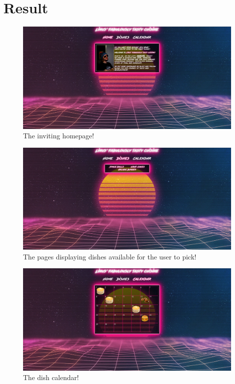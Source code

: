 \documentclass[a4paper]{scrartcl}
\begin{document}
\section{Result}
\begin{figure}[H]
  \begin{center}
    \includegraphics[scale=0.3]{Scr2.jpg}
    \caption{The inviting homepage!}
    \label{fig:homepage}
  \end{center}
\end{figure}

\begin{figure}[H]
  \begin{center}
    \includegraphics[scale=0.3]{Scr3.jpg}
    \caption{The pages displaying dishes available for the user to pick!}
    \label{fig:dishes}
  \end{center}
\end{figure}

\begin{figure}[H]
  \begin{center}
    \includegraphics[scale=0.3]{Scr6.jpg}
    \caption{The dish calendar!}
    \label{fig:calendar}
  \end{center}
\end{figure}
\end{document}
